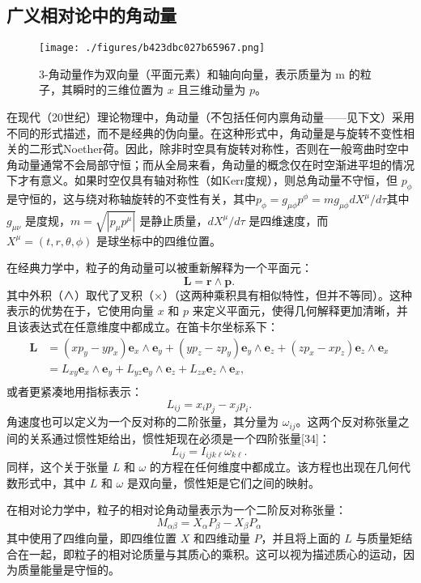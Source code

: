 \subsection{广义相对论中的角动量}
\begin{figure}[ht]
\centering
\texttt{[image: ./figures/b423dbc027b65967.png]}
\caption{3-角动量作为双向量（平面元素）和轴向向量，表示质量为   m 的粒子，其瞬时的三维位置为 \(x\) 且三维动量为 \(p\)。} \label{fig_JDL_11}
\end{figure}
在现代（20世纪）理论物理中，角动量（不包括任何内禀角动量——见下文）采用不同的形式描述，而不是经典的伪向量。在这种形式中，角动量是与旋转不变性相关的二形式Noether荷。因此，除非时空具有旋转对称性，否则在一般弯曲时空中角动量通常不会局部守恒；而从全局来看，角动量的概念仅在时空渐进平坦的情况下才有意义。如果时空仅具有轴对称性（如Kerr度规），则总角动量不守恒，但 \( p_{\phi} \) 是守恒的，这与绕对称轴旋转的不变性有关，其中\(p_{\phi} = g_{\mu \phi} p^{\phi} = m g_{\mu \phi} dX^{\mu}/d\tau\)其中 \( g_{\mu \nu} \) 是度规，\( m = \sqrt{|p_{\mu} p^{\mu}|} \) 是静止质量，\( dX^{\mu}/d\tau \) 是四维速度，而 \( X^{\mu} = (t, r, \theta, \phi) \) 是球坐标中的四维位置。 

在经典力学中，粒子的角动量可以被重新解释为一个平面元：
\[
\mathbf{L} = \mathbf{r} \wedge \mathbf{p}.~
\]
其中外积（∧）取代了叉积（×）（这两种乘积具有相似特性，但并不等同）。这种表示的优势在于，它使用向量 \( x \) 和 \( p \) 来定义平面元，使得几何解释更加清晰，并且该表达式在任意维度中都成立。在笛卡尔坐标系下：
\begin{equation}
\begin{aligned}
\mathbf{L} &= (x p_y - y p_x) \mathbf{e}_x \wedge \mathbf{e}_y + (y p_z - z p_y) \mathbf{e}_y \wedge \mathbf{e}_z + (z p_x - x p_z) \mathbf{e}_z \wedge \mathbf{e}_x \\
& = L_{xy} \mathbf{e}_x \wedge \mathbf{e}_y + L_{yz} \mathbf{e}_y \wedge \mathbf{e}_z + L_{zx} \mathbf{e}_z \wedge \mathbf{e}_x , \\
\end{aligned}~
\end{equation}
或者更紧凑地用指标表示：
\[
L_{ij} = x_i p_j - x_j p_i .~
\]
角速度也可以定义为一个反对称的二阶张量，其分量为 \( \omega_{ij} \)。这两个反对称张量之间的关系通过惯性矩给出，惯性矩现在必须是一个四阶张量[34]：
\[
L_{ij} = I_{ijk\ell} \omega_{k\ell} .~
\]
同样，这个关于张量 \( L \) 和 \( \omega \) 的方程在任何维度中都成立。该方程也出现在几何代数形式中，其中 \( L \) 和 \( \omega \) 是双向量，惯性矩是它们之间的映射。

在相对论力学中，粒子的相对论角动量表示为一个二阶反对称张量：
\[
M_{\alpha \beta} = X_{\alpha} P_{\beta} - X_{\beta} P_{\alpha} ~
\]
其中使用了四维向量，即四维位置 \( X \) 和四维动量 \( P \)，并且将上面的 \( L \) 与质量矩结合在一起，即粒子的相对论质量与其质心的乘积。这可以视为描述质心的运动，因为质量能量是守恒的。

